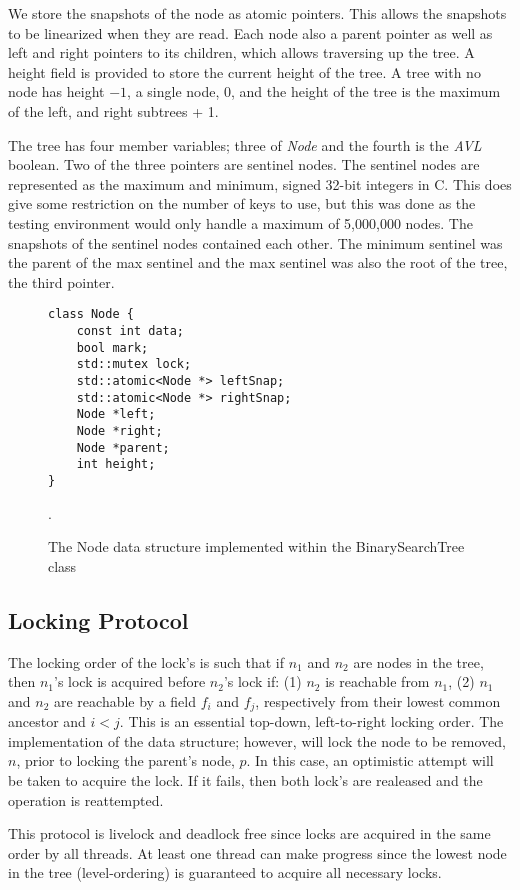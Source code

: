 \documentclass[11pt]{article}
\theoremstyle{definition}
\theoremstyle{theorem}
\begin{document}
We store the snapshots of the node as atomic pointers. This allows the snapshots to be linearized when they are read. Each node also a parent pointer as well as left and right pointers to its children, which allows traversing up the tree. A height field is provided to store the current height of the tree. A tree with no node has height $-1$, a single node, 0, and the height of the tree is the maximum of the left, and right subtrees + 1.

The tree has four member variables; three of \textit{Node} and the fourth is the \textit{AVL} boolean. Two of the three pointers are sentinel nodes. The sentinel nodes are represented as the maximum and minimum, signed 32-bit integers in C. This does give some restriction on the number of keys to use, but this was done as the testing environment would only handle a maximum of 5,000,000 nodes. The snapshots of the sentinel nodes contained each other. The minimum sentinel was the parent of the max sentinel and the max sentinel was also the root of the tree, the third pointer.
\begin{figure}[t]
\label{fig:node}
\centering
\begin{lstlisting}
class Node {
	const int data;
	bool mark;
	std::mutex lock;
	std::atomic<Node *> leftSnap;
	std::atomic<Node *> rightSnap;
	Node *left;
	Node *right;
	Node *parent;
	int height;
}
\end{lstlisting}
\caption{The Node data structure implemented within the BinarySearchTree class}.
\end{figure}

\subsection{Locking Protocol}
The locking order of the lock's is such that if $n_1$ and $n_2$ are nodes in the tree, then $n_1$'s lock is acquired before $n_2$'s lock if: (1) $n_2$ is reachable from $n_1$, (2) $n_1$ and $n_2$ are reachable by a field $f_i$ and $f_j$, respectively from their lowest common ancestor and $i<j$. This is an essential top-down, left-to-right locking order. The implementation of the data structure; however, will lock the node to be removed, $n$, prior to locking the parent's node, $p$. In this case, an optimistic attempt will be taken to acquire the lock. If it fails, then both lock's are realeased and the operation is reattempted.

This protocol is livelock and deadlock free since locks are acquired in the same order by all threads. At least one thread can make progress since the lowest node in the tree (level-ordering) is guaranteed to acquire all necessary locks.
\end{document}
